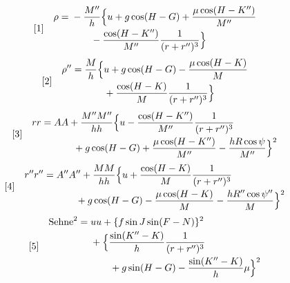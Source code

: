 \[
\begin{array}{l@{\quad}l}
[1]&\begin{aligned}
\rho={}&-\frac{M''}{h}\Bigl\{u+g\cos(H-G)+\frac{\mu\cos(H-K'')}{M''}\\
&\qquad{}-\frac{\cos(H-K'')}{M''}\frac{1}{(r+r'')^3}\Bigr\}
\end{aligned}
\end{array}
\]
\[
\begin{array}{l@{\quad}l}
[2]&\begin{aligned}
\rho''={}&\frac{M}{h}\Bigl\{u+g\cos(H-G)-\frac{\mu\cos(H-K)}{M}\\
&\qquad{}+\frac{\cos(H-K)}{M}\frac{1}{(r+r'')^3}\Bigr\}
\end{aligned}
\end{array}
\]
\[
\begin{array}{l@{\quad}l}
[3]&\begin{aligned}
rr={}&AA+\frac{M''M''}{hh}\Bigl\{u-\frac{\cos(H-K'')}{M''}\frac{1}{(r+r'')^3}\\
&\qquad{}+g\cos(H-G)+\frac{\mu\cos(H-K'')}{M''}-\frac{hR\cos\psi}{M''}\Bigr\}^2
\end{aligned}
\end{array}
\]
\[
\begin{array}{l@{\quad}l}
[4]&\begin{aligned}
r''r''={}&A''A''+\frac{MM}{hh}\Bigl\{u+\frac{\cos(H-K)}{M}\frac{1}{(r+r'')^3}\\
&\qquad{}+g\cos(H-G)-\frac{\mu\cos(H-K)}{M}-\frac{hR''\cos\psi''}{M}\Bigr\}^2
\end{aligned}
\end{array}
\]
\[
\begin{array}{l@{\quad}l}
[5]&\begin{aligned}
\text{Sehne}^2={}&uu+\{f\sin J\sin(F-N)\}^2\\
&+\Bigl\{\frac{\sin(K''-K)}{h}\frac{1}{(r+r'')^3}\\
&\qquad{}+g\sin(H-G)-\frac{\sin(K''-K)}{h}\mu\Bigr\}^2
\end{aligned}
\end{array}
\]

